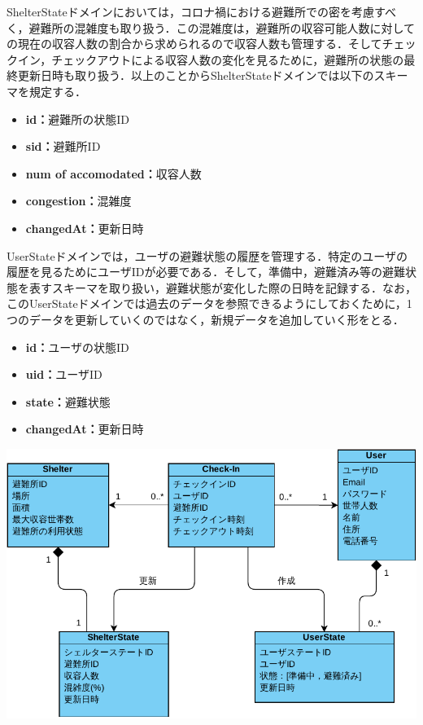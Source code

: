 \documentclass[technicalreport,dvipdfmx]{ieicej}
\begin{document}
ShelterStateドメインにおいては，コロナ禍における避難所での密を考慮すべく，避難所の混雑度も取り扱う．この混雑度は，避難所の収容可能人数に対しての現在の収容人数の割合から求められるので収容人数も管理する．そしてチェックイン，チェックアウトによる収容人数の変化を見るために，避難所の状態の最終更新日時も取り扱う．以上のことからShelterStateドメインでは以下のスキーマを規定する．

\begin{itemize}
     \item{\textbf{id：}}避難所の状態ID
     \item{\textbf{sid：}}避難所ID
     \item{\textbf{num of accomodated：}}収容人数
     \item{\textbf{congestion：}}混雑度
     \item{\textbf{changedAt：}}更新日時
 \end{itemize}

UserStateドメインでは，ユーザの避難状態の履歴を管理する．特定のユーザの履歴を見るためにユーザIDが必要である．そして，準備中，避難済み等の避難状態を表すスキーマを取り扱い，避難状態が変化した際の日時を記録する．なお，このUserStateドメインでは過去のデータを参照できるようにしておくために，1つのデータを更新していくのではなく，新規データを追加していく形をとる．

 \begin{itemize}
     \item{\textbf{id：}}ユーザの状態ID
     \item{\textbf{uid：}}ユーザID
     \item{\textbf{state：}}避難状態
     \item{\textbf{changedAt：}}更新日時
 \end{itemize}

%
\includegraphics[scale=0.5,pagebox=cropbox,clip]{domain_model.pdf}
\end{document}
